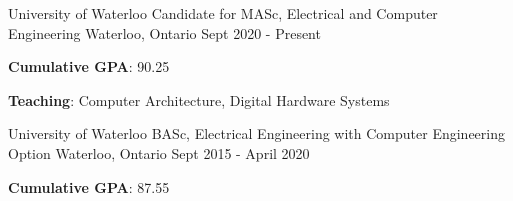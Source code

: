 

\begin{cventries}

    \cventry
    {University of Waterloo} %
    {Candidate for MASc, Electrical and Computer Engineering} %
    {Waterloo, Ontario} %
    {Sept 2020 - Present} %
    {
      \begin{cvitems} %
        \item \textbf{Cumulative GPA}: 90.25
        \item \textbf{Teaching}: Computer Architecture, Digital Hardware Systems
      \end{cvitems}
    }
  
  \cventry
    {University of Waterloo} %
    {BASc, Electrical Engineering with Computer Engineering Option} %
    {Waterloo, Ontario} %
    {Sept 2015 - April 2020} %
    {
      \begin{cvitems} %
        \item \textbf{Cumulative GPA}: 87.55
      \end{cvitems}
    }

\end{cventries}
